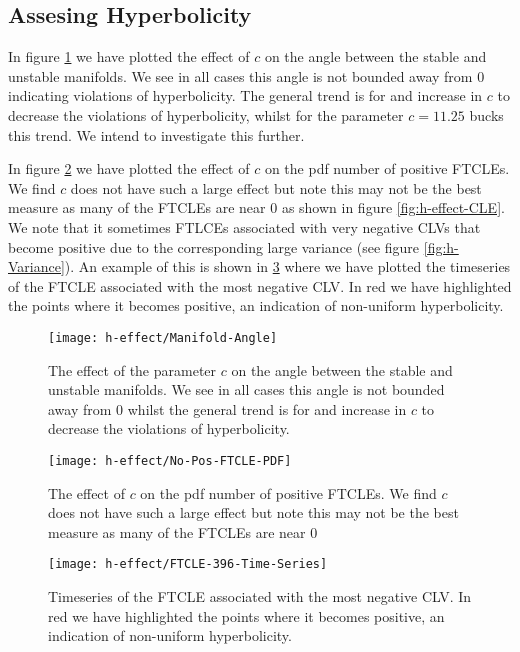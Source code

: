 \subsection{Assesing Hyperbolicity}

In figure \ref{fig:h-effect-Angle} we have plotted the effect of $c$ on the angle between the stable and unstable manifolds. We see in all cases this angle is not bounded away from $0$ indicating violations of hyperbolicity. The general trend is for and increase in $c$ to decrease the violations of hyperbolicity, whilst for the parameter $c=11.25$ bucks this trend. We intend to investigate this further.

In figure \ref{fig:h-effect-kd-pdf} we have plotted the effect of $c$ on the pdf number of positive FTCLEs. We find $c$ does not have such a large effect but note this may not be the best measure as many of the FTCLEs are near $0$ as shown in figure \ref{fig:h-effect-CLE}. We note that it sometimes FTLCEs associated with very negative CLVs that become positive due to the corresponding large variance (see figure \ref{fig:h-Variance}). An example of this is shown in \ref{fig:h-effect-pos-neg-example} where we have plotted the timeseries of the FTCLE associated with the most negative CLV. In red we have highlighted the points where it becomes positive, an indication of non-uniform hyperbolicity.

\begin{figure}
\centering
\texttt{[image: h-effect/Manifold-Angle]}
\caption{The effect of the parameter $c$ on the angle between the stable and unstable manifolds. We see in all cases this angle is not bounded away from $0$ whilst the general trend is for and increase in $c$ to decrease the violations of hyperbolicity.}
\label{fig:h-effect-Angle}
\end{figure}

\begin{figure}
\centering
\texttt{[image: h-effect/No-Pos-FTCLE-PDF]}
\caption{The effect of $c$ on the pdf number of positive FTCLEs. We find $c$ does not have such a large effect but note this may not be the best measure as many of the FTCLEs are near $0$}
\label{fig:h-effect-kd-pdf}
\end{figure}

\begin{figure}
\centering
\texttt{[image: h-effect/FTCLE-396-Time-Series]}
\caption{Timeseries of the FTCLE associated with the most negative CLV. In red we have highlighted the points where it becomes positive, an indication of non-uniform hyperbolicity.}
\label{fig:h-effect-pos-neg-example}
\end{figure}
